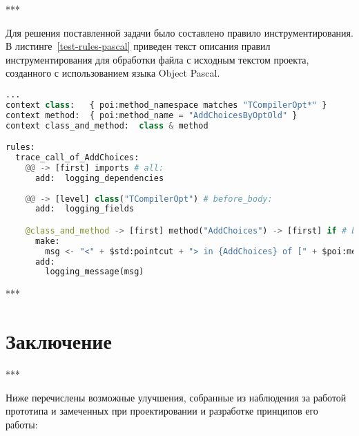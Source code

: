 ***

Для решения поставленной задачи было составлено правило инструментирования.
В листинге~\ref{test-rules-pascal} приведен текст описания правил инструментирования для обработки файла с исходным текстом проекта, созданного с использованием языка Object Pascal.

\begin{lstlisting}[frame=single, language=Python, label={test-rules-pascal}, caption={Описание правил инструментирования. Object Pascal-проект.}]
...
context class:   { poi:method_namespace matches "TCompilerOpt*" }
context method:  { poi:method_name = "AddChoicesByOptOld" }
context class_and_method:  class & method

rules:
  trace_call_of_AddChoices:
    @@ -> [first] imports # all:
      add:  logging_dependencies
  
    @@ -> [level] class("TCompilerOpt") # before_body:
      add:  logging_fields

    @class_and_method -> [first] method("AddChoices") -> [first] if # before:
      make:
        msg <- "<" + $std:pointcut + "> in {AddChoices} of [" + $poi:method_name_full + "] method";
      add:
        logging_message(msg)
\end{lstlisting}

***

\section{Заключение}

***

Ниже перечислены возможные улучшения, собранные из наблюдения за работой прототипа и замеченных при проектировании и разработке принципов его работы:


